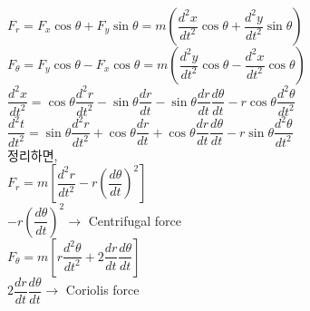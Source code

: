 \documentclass[11pt]{beamer}
\begin{document}
\begin{frame}{1.3}\footnotesize

	$ F_{r} = F_{x} \cos \theta + F_{y} \sin \theta 
	= m \left ( \dfrac{d^{2}x}{dt^{2}} \cos \theta + \dfrac{d^{2}y}{dt^{2}} \sin \theta \right) $\\
	
	$ F_{\theta} = F_{y} \cos \theta - F_{x} \cos \theta 
	= m \left ( \dfrac{d^{2}y}{dt^{2}} \cos \theta - \dfrac{d^{2}x}{dt^{2}} \cos \theta \right) $\\
	
	$\dfrac{d^{2}x}{dt^{2}} = \cos \theta \dfrac{d^{2}r}{dt^{2}} - \sin \theta \dfrac{dr}{dt} - \sin \theta \dfrac{dr}{dt} \dfrac{d\theta}{dt} -r \cos \theta \dfrac{d^{2}\theta}{dt^{2}}$\\
	
	$\dfrac{d^{2}t}{dt^{2}} = \sin \theta \dfrac{d^{2}r}{dt^{2}} + \cos \theta \dfrac{dr}{dt} + \cos \theta \dfrac{dr}{dt} \dfrac{d\theta}{dt} -r \sin \theta \dfrac{d^{2}\theta}{dt^{2}}$\\
	
	
	정리하면, \\
	
	$ F_{r} = m \left[ \dfrac{d^{2}r}{dt^{2}} - r \left( {\dfrac{d \theta}{dt}} \right)^{2} \right] $\\
	
	$ -r \left( {\dfrac{d \theta}{dt}} \right)^{2} \rightarrow $ Centrifugal force \\
	
	$ F_{\theta} = m \left[ r \dfrac{d^{2}\theta}{dt^{2}} + 2 \dfrac{dr}{dt} \dfrac{d\theta}{dt}  \right] $\\
	
	$ 2 \dfrac{dr}{dt} \dfrac{d\theta}{dt} \rightarrow $ Coriolis force \\

\end{frame}
\end{document}
